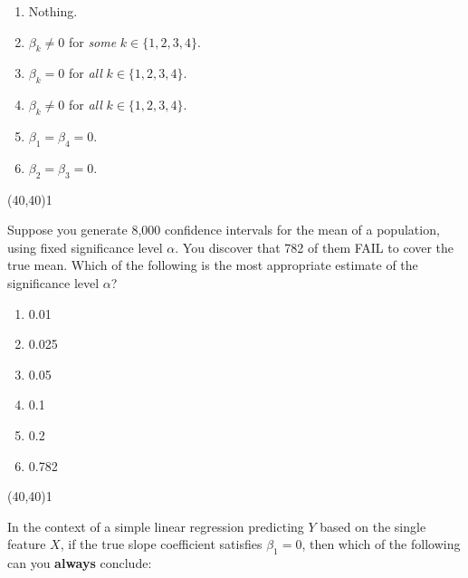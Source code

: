 \documentclass[addpoints]{exam}
\def\solutions{0}
\begin{document}
{\begin{questions}
\vspace{2mm}

\begin{minipage}[b]{.85\textwidth}
	\begin{enumerate}[label=\Alph*.]
		\item Nothing.
		\item $\beta_k\ne 0$ for \textit{some} $k \in \{1,2,3,4\}$.
		\item $\beta_k=0$ for \textit{all} $k \in \{1,2,3,4\}$.
		\item $\beta_k\ne 0$ for \textit{all} $k \in \{1,2,3,4\}$.
		\item $\beta_1=\beta_4=0.$
		\item $\beta_2=\beta_3=0.$
	\end{enumerate}
\end{minipage}
\begin{minipage}[b]{.1\textwidth}
	\vspace{\fill}\framebox(40,40){\if\solutions1 \fi}
\end{minipage}

\question[3]  Suppose you generate 8,000 confidence intervals for the mean of a population, using fixed significance level $\alpha$. You discover that 782 of them FAIL to cover the true mean. Which of the following is the most appropriate estimate of the significance level $\alpha$?

\vspace{2mm}

\begin{minipage}[b]{.85\textwidth}
	\begin{enumerate}[label=\Alph*.]
		\item 0.01
		\item 0.025
		\item 0.05
		\item 0.1
		\item 0.2
		\item 0.782		
	\end{enumerate}
\end{minipage}
\begin{minipage}[b]{.1\textwidth}
	\vspace{\fill}\framebox(40,40){\if\solutions1 \fi}
\end{minipage}


\question[3] In the context of a simple linear regression predicting $Y$ based on the single feature $X$, if the true slope coefficient satisfies $\beta_1=0$, then which of the following can you \textbf{always} conclude:
\vspace{2mm}


\end{questions}}
\end{document}
